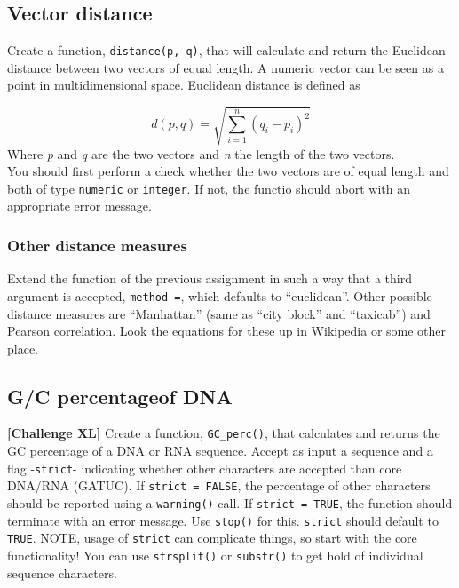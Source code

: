 \documentclass[]{book}
\begin{document}
\hypertarget{vector-distance}{%
\subsection{Vector distance}\label{vector-distance}}

Create a function, \texttt{distance(p,\ q)}, that will calculate and return the Euclidean distance between two vectors of equal length. A numeric vector can be seen as a point in multidimensional space. Euclidean distance is defined as

\[d(p, q) = \sqrt{\sum_{i = 1}^{n}(q_i-p_i)^2}\]
Where \emph{p} and \emph{q} are the two vectors and \emph{n} the length of the two vectors.\\
You should first perform a check whether the two vectors are of equal length and both of type \texttt{numeric} or \texttt{integer}. If not, the functio should abort with an appropriate error message.

\hypertarget{other-distance-measures}{%
\subsubsection*{Other distance measures}\label{other-distance-measures}}

Extend the function of the previous assignment in such a way that a third argument is accepted, \texttt{method\ =}, which defaults to ``euclidean''. Other possible distance measures are ``Manhattan'' (same as ``city block'' and ``taxicab'') and Pearson correlation. Look the equations for these up in Wikipedia or some other place.

\hypertarget{gc-percentageof-dna}{%
\subsection{G/C percentageof DNA}\label{gc-percentageof-dna}}

\textbf{{[}Challenge XL{]}} Create a function, \texttt{GC\_perc()}, that calculates and returns the GC percentage of a DNA or RNA sequence. Accept as input a sequence and a flag -\texttt{strict}- indicating whether other characters are accepted than core DNA/RNA (GATUC). If \texttt{strict\ =\ FALSE}, the percentage of other characters should be reported using a \texttt{warning()} call. If \texttt{strict\ =\ TRUE}, the function should terminate with an error message. Use \texttt{stop()} for this. \texttt{strict} should default to \texttt{TRUE}. NOTE, usage of \texttt{strict} can complicate things, so start with the core functionality!
You can use \texttt{strsplit()} or \texttt{substr()} to get hold of individual sequence characters.
\end{document}
